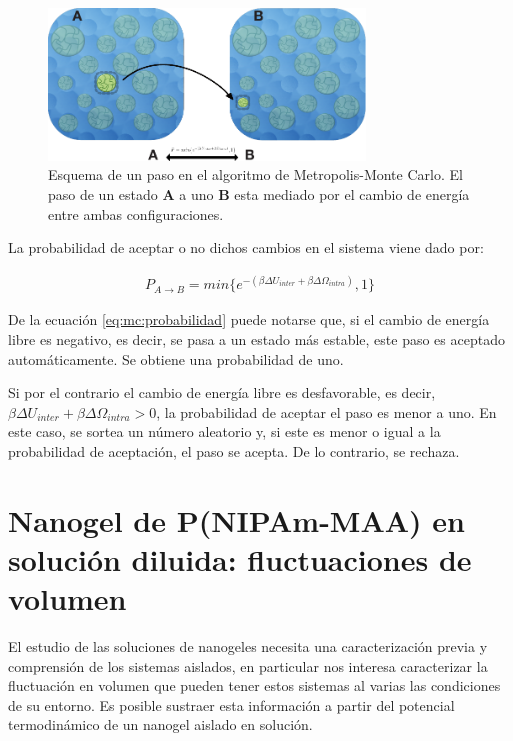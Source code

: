 	\begin{figure}[!htb]
		\centering
		\includegraphics[width=0.75\textwidth]{Figures/modelos/mc_model.pdf}
		\caption{Esquema de un paso en el algoritmo de Metropolis-Monte Carlo. El paso de un estado \textbf{A} a uno \textbf{B} esta mediado por el cambio de energ\'ia entre ambas configuraciones. }
		\label{fig:mc:pasos_mc}
	\end{figure}
	
	La probabilidad de aceptar o no dichos cambios en el sistema viene dado por:
	
	\begin{align}
		P_{A \to B} = min \{e^{-(\beta\Delta U_{inter} +\beta \Delta \Omega_{intra})},1\}
		\label{eq:mc:probabilidad}
	\end{align}
	
	
		De la  ecuaci\'on \ref{eq:mc:probabilidad} puede notarse que, si el cambio de energ\'ia libre es negativo, es decir, se pasa a un estado m\'as estable, este paso es aceptado autom\'aticamente. Se obtiene una probabilidad de uno. 
	
	
	Si por el contrario el cambio de energ\'ia libre es desfavorable, es decir, $\beta\Delta U_{inter} + \beta\Delta \Omega_{intra} > 0$, la probabilidad de aceptar el paso es menor a uno. En este caso, se sortea un n\'umero aleatorio y, si este es menor o igual a la probabilidad de aceptaci\'on, el paso se acepta. De lo contrario, se rechaza. 
	

	
	\section{Nanogel de P(NIPAm-MAA) en soluci\'on diluida: fluctuaciones de volumen} \label{sec:fluctuacion-volumen}
	
	El estudio de las soluciones de nanogeles necesita una caracterizaci\'on previa y comprensi\'on de los sistemas aislados, en particular nos interesa caracterizar la fluctuaci\'on en volumen que pueden tener estos sistemas al varias las condiciones de su entorno.  Es posible sustraer esta informaci\'on a partir del potencial termodin\'amico de un nanogel aislado en soluci\'on.
	
